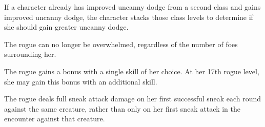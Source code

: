 \par If a character already has improved uncanny dodge from a second class and gains improved uncanny dodge, the character stacks those class levels to determine if she should gain greater uncanny dodge.

 The rogue can no longer be overwhelmed, regardless of the number of foes surrounding her.

 The rogue gains a  bonus with a single skill of her choice. At her 17th rogue level, she may gain this bonus with an additional skill.

 The rogue deals full sneak attack damage on her first successful sneak each round against the same creature, rather than only on her first sneak attack in the encounter against that creature.

